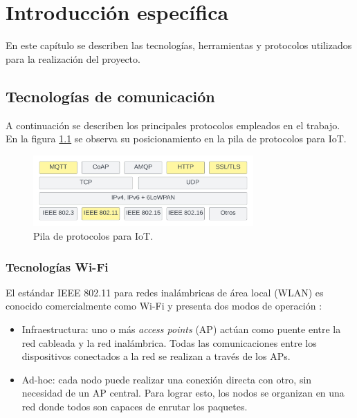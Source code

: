 \chapter{Introducción específica} %

\label{Chapter2}

En este capítulo se describen las tecnologías, herramientas y protocolos utilizados para la realización del proyecto.

\section{Tecnologías de comunicación}
\label{sec:Tecnologías de comunicación}
A continuación se describen los principales protocolos empleados en el trabajo. En la figura \ref{fig:IotProtocols} se observa su posicionamiento en la pila de protocolos para IoT.

\begin{figure}[h]
	\centering
	\includegraphics[width=0.75\textwidth]{./Figures/protocols.jpeg}
	\caption[Pila de protocolos para IoT.]{Pila de protocolos para IoT\protect\footnotemark.}
	\label{fig:IotProtocols}

\end{figure}

\subsection{Tecnologías Wi-Fi}
\label{sec:Tecnologías Wi-Fi}
El estándar IEEE 802.11 para redes inalámbricas de área local (WLAN) es conocido comercialmente como Wi-Fi y presenta dos modos de operación \citep{wifi}:
\begin{itemize}
\item Infraestructura: uno o más \textit{access points} (AP) actúan como puente entre la red cableada y la red inalámbrica. Todas las comunicaciones entre los dispositivos conectados a la red se realizan a través de los APs. 
\item Ad-hoc: cada nodo puede realizar una conexión directa con otro, sin necesidad de un AP central. Para lograr esto, los nodos se organizan en una red donde todos son capaces de enrutar los paquetes.  
\end{itemize}

